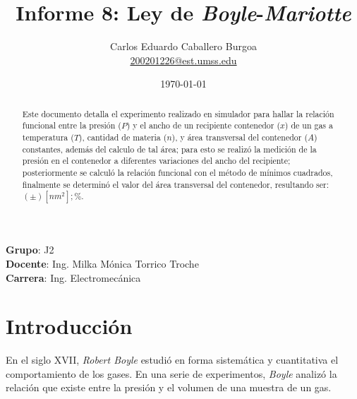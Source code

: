 \documentclass[letter,11pt]{article}
\title{Informe 8: Ley de \emph{Boyle}-\emph{Mariotte}}
\author{Carlos Eduardo Caballero Burgoa \\
    \small{\href{mailto:200201226@est.umss.edu}{200201226@est.umss.edu}}
}
\date{\today}
\begin{document}
\maketitle
\begin{center}
    \textbf{Grupo}: J2\\
    \textbf{Docente}: Ing. Milka Mónica Torrico Troche\\
    \textbf{Carrera}: Ing. Electromecánica
\end{center}

\begin{abstract}
Este documento detalla el experimento realizado en simulador para hallar la
relación funcional entre la presión ($P$) y el ancho de un recipiente
contenedor ($x$) de un gas a temperatura ($T$), cantidad de materia ($n$), y
área transversal del contenedor ($A$) constantes, además del calculo de tal
área; para esto se realizó la medición de la presión en el contenedor a
diferentes variaciones del ancho del recipiente; posteriormente se calculó la
relación funcional con el método de mínimos cuadrados, finalmente se determinó
el valor del área transversal del contenedor, resultando ser:
$( \pm )[nm^2]; \%$.
\end{abstract}

\section{Introducción}

En el siglo XVII, \emph{Robert Boyle} estudió en forma sistemática y
cuantitativa el comportamiento de los gases. En una serie de experimentos,
\emph{Boyle} analizó la relación que existe entre la presión y el volumen de una
muestra de un gas. 
\end{document}
